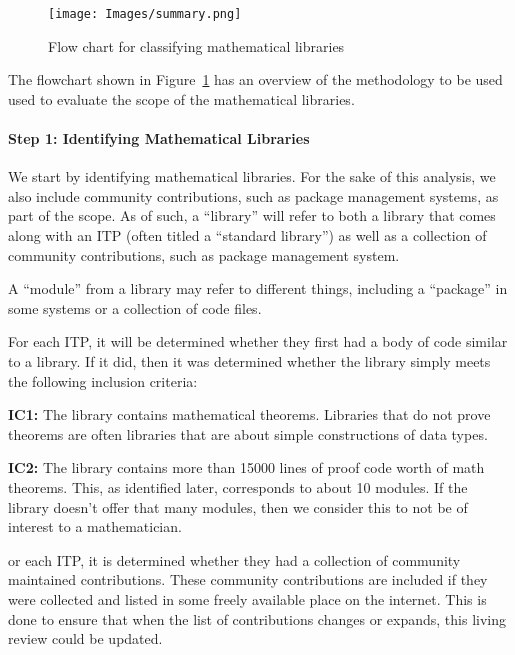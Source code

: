 \documentclass[
]{article}
\begin{document}
\begin{figure}
\hypertarget{fig:classification_summary}{%
\centering
\texttt{[image: Images/summary.png]}
\caption{Flow chart for classifying mathematical
libraries}\label{fig:classification_summary}
}
\end{figure}

The flowchart shown in Figure~\ref{fig:classification_summary} has an
overview of the methodology to be used used to evaluate the scope of the
mathematical libraries.

\hypertarget{sec:identifying_math_lib_meth}{%
\paragraph{Step 1: Identifying Mathematical
Libraries}\label{sec:identifying_math_lib_meth}}

We start by identifying mathematical libraries. For the sake of this
analysis, we also include community contributions, such as package
management systems, as part of the scope. As of such, a ``library'' will
refer to both a library that comes along with an ITP (often titled a
``standard library'') as well as a collection of community
contributions, such as package management system.

A ``module'' from a library may refer to different things, including a
``package'' in some systems or a collection of code files.

For each ITP, it will be determined whether they first had a body of
code similar to a library. If it did, then it was determined whether the
library simply meets the following inclusion criteria:

\textbf{IC1:} The library contains mathematical theorems. Libraries that
do not prove theorems are often libraries that are about simple
constructions of data types.

\textbf{IC2:} The library contains more than 15000 lines of proof code
worth of math theorems. This, as identified later, corresponds to about
10 modules. If the library doesn't offer that many modules, then we
consider this to not be of interest to a mathematician.

or each ITP, it is determined whether they had a collection of community
maintained contributions. These community contributions are included if
they were collected and listed in some freely available place on the
internet. This is done to ensure that when the list of contributions
changes or expands, this living review could be updated.
\end{document}
